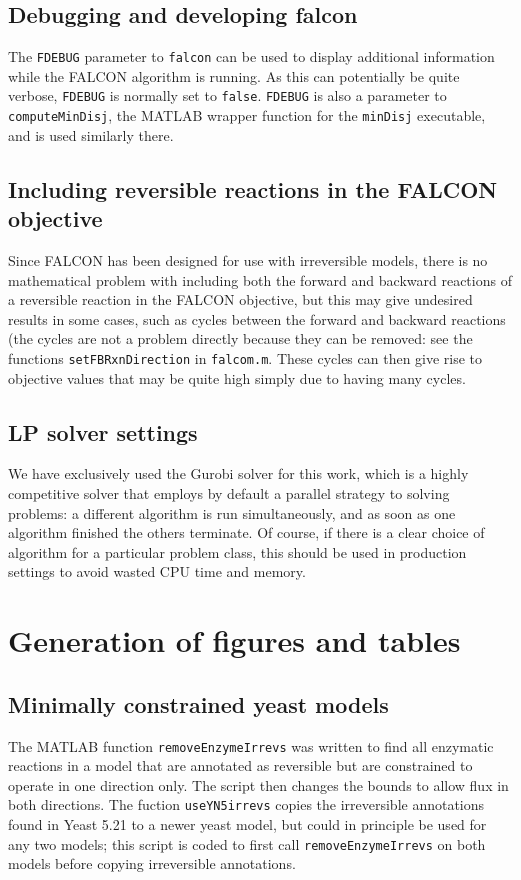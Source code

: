 \subsection{Debugging and developing falcon}
The \texttt{FDEBUG} parameter to \texttt{falcon} can be used to
display additional information while the FALCON algorithm is
running. As this can potentially be quite verbose, \texttt{FDEBUG} is
normally set to \texttt{false}. \texttt{FDEBUG} is also a parameter to
\texttt{computeMinDisj}, the MATLAB wrapper function for the
\texttt{minDisj} executable, and is used similarly there.


\subsection{Including reversible reactions in the FALCON objective}
Since FALCON has been designed for use with irreversible models, there
is no mathematical problem with including both the forward and
backward reactions of a reversible reaction in the FALCON objective,
but this may give undesired results in some cases, such as cycles
between the forward and backward reactions (the cycles are not a
problem directly because they can be removed: see the functions
\texttt{setFBRxnDirection} in \texttt{falcom.m}.  These cycles can
then give rise to objective values that may be quite high simply due
to having many cycles.

\subsection{LP solver settings}
We have exclusively used the Gurobi solver \citep{gurobi} for this
work, which is a highly competitive solver that employs by default a
parallel strategy to solving problems: a different algorithm is run
simultaneously, and as soon as one algorithm finished the others
terminate. Of course, if there is a clear choice of algorithm for a
particular problem class, this should be used in production settings
to avoid wasted CPU time and memory.

\section{Generation of figures and tables}

\subsection{Minimally constrained yeast models}
The MATLAB function \texttt{removeEnzymeIrrevs} was written to find
all enzymatic reactions in a model that are annotated as reversible
but are constrained to operate in one direction only. The script then
changes the bounds to allow flux in both directions. The fuction
\texttt{useYN5irrevs} copies the irreversible annotations found in
Yeast 5.21 \citep{Lee2012} to a newer yeast model, but could in
principle be used for any two models; this script is coded to first
call \texttt{removeEnzymeIrrevs} on both models before copying
irreversible annotations.
